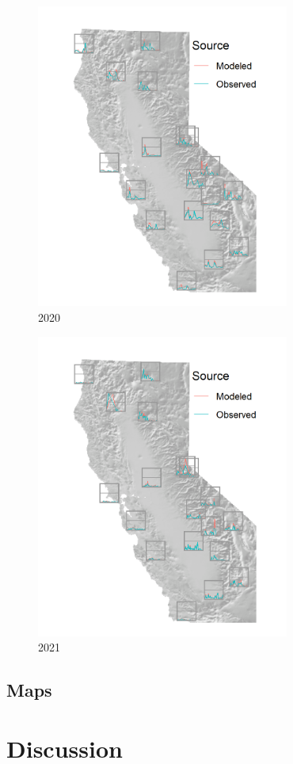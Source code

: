 \documentclass[gmd, manuscript]{copernicus}
\begin{document}
\begin{figure}
\includegraphics[width=8.3cm]{./Figures/Spark2020_GMD} \caption{2020}\label{fig:unnamed-chunk-5}
\end{figure}

\begin{figure}
\includegraphics[width=8.3cm]{./Figures/Spark2021_GMD} \caption{2021}\label{fig:unnamed-chunk-6}
\end{figure}

\subsection{Maps}

\section{Discussion}
\end{document}
